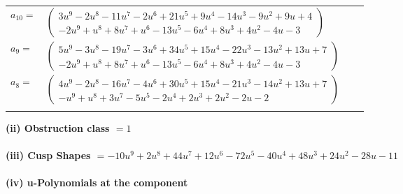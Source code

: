 \documentclass[1p]{elsarticle_modified}
\theoremstyle{definition}
\begin{document}
\begin{tabular}{m{7pt} m{180pt} m{7pt} m{180pt} }
\flushright $a_{10}=$&$\begin{pmatrix}3 u^9-2 u^8-11 u^7-2 u^6+21 u^5+9 u^4-14 u^3-9 u^2+9 u+4\\-2 u^9+u^8+8 u^7+u^6-13 u^5-6 u^4+8 u^3+4 u^2-4 u-3\end{pmatrix}$ \\
\flushright $a_{9}=$&$\begin{pmatrix}5 u^9-3 u^8-19 u^7-3 u^6+34 u^5+15 u^4-22 u^3-13 u^2+13 u+7\\-2 u^9+u^8+8 u^7+u^6-13 u^5-6 u^4+8 u^3+4 u^2-4 u-3\end{pmatrix}$ \\
\flushright $a_{8}=$&$\begin{pmatrix}4 u^9-2 u^8-16 u^7-4 u^6+30 u^5+15 u^4-21 u^3-14 u^2+13 u+7\\- u^9+u^8+3 u^7-5 u^5-2 u^4+2 u^3+2 u^2-2 u-2\end{pmatrix}$\\&\end{tabular}
\flushleft \textbf{(ii) Obstruction class $= 1$}\\~\\
\flushleft \textbf{(iii) Cusp Shapes $= -10 u^9+2 u^8+44 u^7+12 u^6-72 u^5-40 u^4+48 u^3+24 u^2-28 u-11$}\\~\\
\newpage\renewcommand{\arraystretch}{1}
\flushleft \textbf{(iv) u-Polynomials at the component}\newline \\
\end{document}
